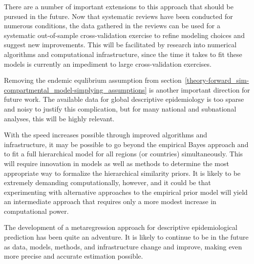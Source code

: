There are a number of important extensions to this approach that
should be pursued in the future.  Now that systematic reviews have
been conducted for numerous conditions, the data gathered in the
reviews can be used for a systematic out-of-sample cross-validation
exercise to refine modeling choices and suggest new improvements.
This will be facilitated by research into numerical algorithms and
computational infrastructure, since the time it takes to fit these
models is currently an impediment to large cross-validation exercises.

Removing the endemic equlibrium assumption from
section~\ref{theory-forward_sim-compartmental_model-simplying_assumptions}
is another important direction for future work.  The available data
for global descriptive epidemiology is too sparse and noisy to justify
this complication, but for many national and subnational analyses,
this will be highly relevant.

With the speed increases possible through improved algorithms and
infrastructure, it may be possible to go beyond the empirical Bayes
approach and to fit a full hierarchical model for all regions (or
countries) simultaneously.  This will require innovation in models as
well as methods to determine the most appropriate way to formalize the
hierarchical similarity priors.  It is likely to be extremely
demanding computationally, however, and it could be that experimenting
with alternative approaches to the empirical prior model will yield an
intermediate approach that requires only a more modest increase in
computational power.





The development of a metaregression approach for descriptive
epidemiological prediction has been quite an adventure.  It is likely
to continue to be in the future as data, models, methods, and
infrastructure change and improve, making even more precise and
accurate estimation possible.
